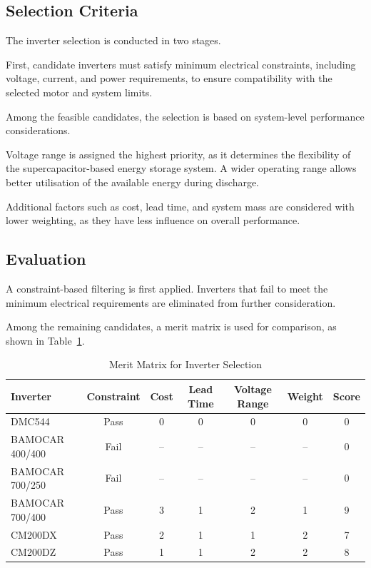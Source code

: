 \documentclass[11pt, a4paper]{report}
\numberwithin{equation}{section}
\begin{document}
\subsection{Selection Criteria}

The inverter selection is conducted in two stages.

First, candidate inverters must satisfy minimum electrical constraints, including voltage, current, and power requirements, to ensure compatibility with the selected motor and system limits.

Among the feasible candidates, the selection is based on system-level performance considerations.

Voltage range is assigned the highest priority, as it determines the flexibility of the supercapacitor-based energy storage system. A wider operating range allows better utilisation of the available energy during discharge.

Additional factors such as cost, lead time, and system mass are considered with lower weighting, as they have less influence on overall performance.

\subsection{Evaluation}

A constraint-based filtering is first applied. Inverters that fail to meet the minimum electrical requirements are eliminated from further consideration.

Among the remaining candidates, a merit matrix is used for comparison, as shown in Table~\ref{tab:inverter_selection}.

\begin{table}[H]
\centering
\caption{Merit Matrix for Inverter Selection}
\label{tab:inverter_selection}
\begin{tabular}{lcccccc}
\toprule
Inverter & Constraint & Cost & Lead Time & Voltage Range & Weight & Score \\
\midrule
DMC544 & Pass & 0 & 0 & 0 & 0 & 0 \\
BAMOCAR 400/400 & Fail & -- & -- & -- & -- & 0 \\
BAMOCAR 700/250 & Fail & -- & -- & -- & -- & 0 \\
BAMOCAR 700/400 & Pass & 3 & 1 & 2 & 1 & 9 \\
CM200DX & Pass & 2 & 1 & 1 & 2 & 7 \\
CM200DZ & Pass & 1 & 1 & 2 & 2 & 8 \\
\bottomrule
\end{tabular}
\end{table}
\end{document}
